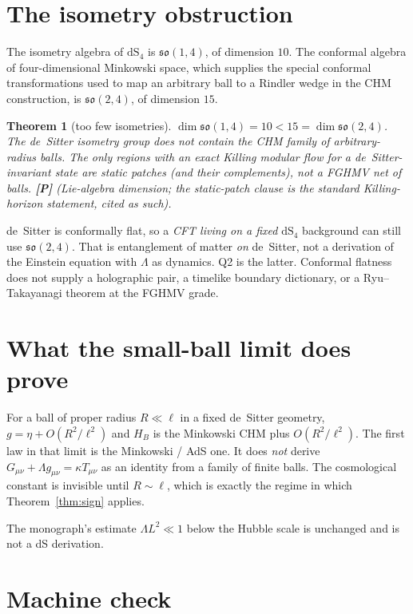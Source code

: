 \documentclass[11pt]{article}
\newtheorem{theorem}{Theorem}[section]
\theoremstyle{definition}
\newcommand{\pP}{\textbf{[P]}}
\begin{document}
\section{The isometry obstruction}

The isometry algebra of $\mathrm{dS}_4$ is $\mathfrak{so}(1,4)$,
of dimension $10$. The conformal algebra of four-dimensional
Minkowski space, which supplies the special conformal
transformations used to map an arbitrary ball to a Rindler wedge
in the CHM construction, is $\mathfrak{so}(2,4)$, of dimension
$15$.

\begin{theorem}[too few isometries]
\label{thm:iso}
$\dim\mathfrak{so}(1,4)=10<15=\dim\mathfrak{so}(2,4)$. The
de~Sitter isometry group does not contain the CHM family of
arbitrary-radius balls. The only regions with an exact Killing
modular flow for a de~Sitter-invariant state are static patches
(and their complements), not a FGHMV net of balls. \pP{}
(Lie-algebra dimension; the static-patch clause is the standard
Killing-horizon statement, cited as such).
\end{theorem}

de~Sitter is conformally flat, so a \emph{CFT living on a fixed}
$\mathrm{dS}_4$ background can still use $\mathfrak{so}(2,4)$.
That is entanglement of matter \emph{on} de~Sitter, not a
derivation of the Einstein equation with $\Lambda$ as dynamics.
Q2 is the latter. Conformal flatness does not supply a holographic
pair, a timelike boundary dictionary, or a Ryu--Takayanagi theorem
at the FGHMV grade.

\section{What the small-ball limit does prove}

For a ball of proper radius $R\ll\ell$ in a fixed de~Sitter
geometry, $g=\eta+O(R^2/\ell^2)$ and $H_B$ is the Minkowski CHM
plus $O(R^2/\ell^2)$. The first law in that limit is the Minkowski
/ AdS one. It does \emph{not} derive
$G_{\mu\nu}+\Lambda g_{\mu\nu}=\kappa T_{\mu\nu}$ as an identity
from a family of finite balls. The cosmological constant is
invisible until $R\sim\ell$, which is exactly the regime in which
Theorem~\ref{thm:sign} applies.

The monograph's estimate $\Lambda L^2\ll 1$ below the Hubble scale
\cite{McGwierMonograph} is unchanged and is not a dS derivation.

\section{Machine check}
\end{document}
